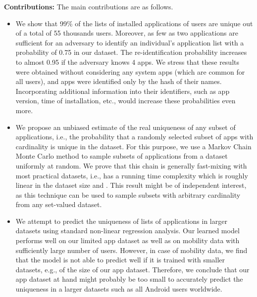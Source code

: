 \documentclass{acm_proc_article-sp}
\theoremstyle{plain}
\theoremstyle{plain}
\theoremstyle{plain}
\theoremstyle{plain}
\theoremstyle{plain}
\theoremstyle{plain}
\begin{document}
\textbf{Contributions:} The main contributions are as follows.
\begin{itemize}
\item We show that 99\% of the lists of installed applications of users are unique out of a total of 55 thousands users. 
Moreover, as few as two applications are sufficient for an adversary to identify an individual's application list with a probability of 0.75 in our dataset. 
The re-identification probability increases to almost 0.95 if the adversary knows 4 apps.
We stress that these results were obtained without considering any system apps (which are common for all users), and apps were identified only by the hash of their names.
Incorporating additional information into their identifiers, such as app version, time of installation, etc., would increase these probabilities even more. 

\item We propose an unbiased estimate of the real uniqueness of any subset of applications, i.e., the probability that a randomly selected subset of apps with cardinality  is unique in the dataset. 
For this purpose, we use a Markov Chain Monte Carlo method to sample subsets of applications from a dataset uniformly at random. 
We prove that this chain is generally fast-mixing with most practical datasets, i.e., has a running time complexity which is roughly linear in the dataset size and . 
This result might be of independent interest, as this technique can be used to sample subsets with arbitrary cardinality from any set-valued dataset. 

\item We attempt to predict the uniqueness of lists of applications in larger datasets using standard non-linear regression analysis. 
Our learned model performs well on our limited app dataset as well as on mobility data with sufficiently large number of users.
However, in case of mobility data, we find that the model is not able to predict well if it is trained with smaller datasets, e.g., of the size of our app dataset.
Therefore, we conclude that our app dataset at hand might probably be too small to accurately predict the uniqueness in a larger datasets such as all Android users worldwide. 
\end{itemize}







 
\end{document}
